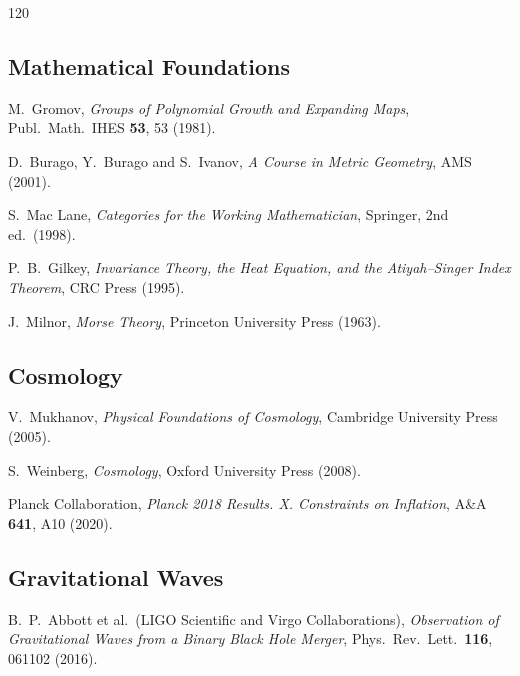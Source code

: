 \documentclass[11pt, twoside, openright]{book}
\theoremstyle{dotted}
\theoremstyle{definition}
\begin{document}
\begin{thebibliography}{120}
\subsection*{Mathematical Foundations}

M.~Gromov,
\textit{Groups of Polynomial Growth and Expanding Maps},
Publ.\ Math.\ IHES \textbf{53}, 53 (1981).

D.~Burago, Y.~Burago and S.~Ivanov,
\textit{A Course in Metric Geometry},
AMS (2001).

S.~Mac Lane,
\textit{Categories for the Working Mathematician},
Springer, 2nd ed.\ (1998).

P.~B.~Gilkey,
\textit{Invariance Theory, the Heat Equation, and the Atiyah--Singer Index Theorem},
CRC Press (1995).

J.~Milnor,
\textit{Morse Theory},
Princeton University Press (1963).

\subsection*{Cosmology}

V.~Mukhanov,
\textit{Physical Foundations of Cosmology},
Cambridge University Press (2005).

S.~Weinberg,
\textit{Cosmology},
Oxford University Press (2008).

Planck Collaboration,
\textit{Planck 2018 Results. X. Constraints on Inflation},
A\&A \textbf{641}, A10 (2020).

\subsection*{Gravitational Waves}

B.~P.~Abbott et al.\ (LIGO Scientific and Virgo Collaborations),
\textit{Observation of Gravitational Waves from a Binary Black Hole Merger},
Phys.\ Rev.\ Lett.\ \textbf{116}, 061102 (2016).

\end{thebibliography}
\end{document}
